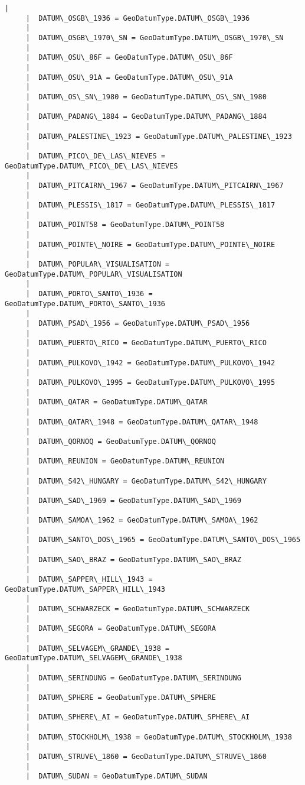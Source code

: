 \documentclass[11pt]{article}
\begin{document}
\begin{Verbatim}[commandchars=\\\{\}]
     |  
     |  DATUM\_OSGB\_1936 = GeoDatumType.DATUM\_OSGB\_1936
     |  
     |  DATUM\_OSGB\_1970\_SN = GeoDatumType.DATUM\_OSGB\_1970\_SN
     |  
     |  DATUM\_OSU\_86F = GeoDatumType.DATUM\_OSU\_86F
     |  
     |  DATUM\_OSU\_91A = GeoDatumType.DATUM\_OSU\_91A
     |  
     |  DATUM\_OS\_SN\_1980 = GeoDatumType.DATUM\_OS\_SN\_1980
     |  
     |  DATUM\_PADANG\_1884 = GeoDatumType.DATUM\_PADANG\_1884
     |  
     |  DATUM\_PALESTINE\_1923 = GeoDatumType.DATUM\_PALESTINE\_1923
     |  
     |  DATUM\_PICO\_DE\_LAS\_NIEVES = GeoDatumType.DATUM\_PICO\_DE\_LAS\_NIEVES
     |  
     |  DATUM\_PITCAIRN\_1967 = GeoDatumType.DATUM\_PITCAIRN\_1967
     |  
     |  DATUM\_PLESSIS\_1817 = GeoDatumType.DATUM\_PLESSIS\_1817
     |  
     |  DATUM\_POINT58 = GeoDatumType.DATUM\_POINT58
     |  
     |  DATUM\_POINTE\_NOIRE = GeoDatumType.DATUM\_POINTE\_NOIRE
     |  
     |  DATUM\_POPULAR\_VISUALISATION = GeoDatumType.DATUM\_POPULAR\_VISUALISATION
     |  
     |  DATUM\_PORTO\_SANTO\_1936 = GeoDatumType.DATUM\_PORTO\_SANTO\_1936
     |  
     |  DATUM\_PSAD\_1956 = GeoDatumType.DATUM\_PSAD\_1956
     |  
     |  DATUM\_PUERTO\_RICO = GeoDatumType.DATUM\_PUERTO\_RICO
     |  
     |  DATUM\_PULKOVO\_1942 = GeoDatumType.DATUM\_PULKOVO\_1942
     |  
     |  DATUM\_PULKOVO\_1995 = GeoDatumType.DATUM\_PULKOVO\_1995
     |  
     |  DATUM\_QATAR = GeoDatumType.DATUM\_QATAR
     |  
     |  DATUM\_QATAR\_1948 = GeoDatumType.DATUM\_QATAR\_1948
     |  
     |  DATUM\_QORNOQ = GeoDatumType.DATUM\_QORNOQ
     |  
     |  DATUM\_REUNION = GeoDatumType.DATUM\_REUNION
     |  
     |  DATUM\_S42\_HUNGARY = GeoDatumType.DATUM\_S42\_HUNGARY
     |  
     |  DATUM\_SAD\_1969 = GeoDatumType.DATUM\_SAD\_1969
     |  
     |  DATUM\_SAMOA\_1962 = GeoDatumType.DATUM\_SAMOA\_1962
     |  
     |  DATUM\_SANTO\_DOS\_1965 = GeoDatumType.DATUM\_SANTO\_DOS\_1965
     |  
     |  DATUM\_SAO\_BRAZ = GeoDatumType.DATUM\_SAO\_BRAZ
     |  
     |  DATUM\_SAPPER\_HILL\_1943 = GeoDatumType.DATUM\_SAPPER\_HILL\_1943
     |  
     |  DATUM\_SCHWARZECK = GeoDatumType.DATUM\_SCHWARZECK
     |  
     |  DATUM\_SEGORA = GeoDatumType.DATUM\_SEGORA
     |  
     |  DATUM\_SELVAGEM\_GRANDE\_1938 = GeoDatumType.DATUM\_SELVAGEM\_GRANDE\_1938
     |  
     |  DATUM\_SERINDUNG = GeoDatumType.DATUM\_SERINDUNG
     |  
     |  DATUM\_SPHERE = GeoDatumType.DATUM\_SPHERE
     |  
     |  DATUM\_SPHERE\_AI = GeoDatumType.DATUM\_SPHERE\_AI
     |  
     |  DATUM\_STOCKHOLM\_1938 = GeoDatumType.DATUM\_STOCKHOLM\_1938
     |  
     |  DATUM\_STRUVE\_1860 = GeoDatumType.DATUM\_STRUVE\_1860
     |  
     |  DATUM\_SUDAN = GeoDatumType.DATUM\_SUDAN

\end{Verbatim}
\end{document}
